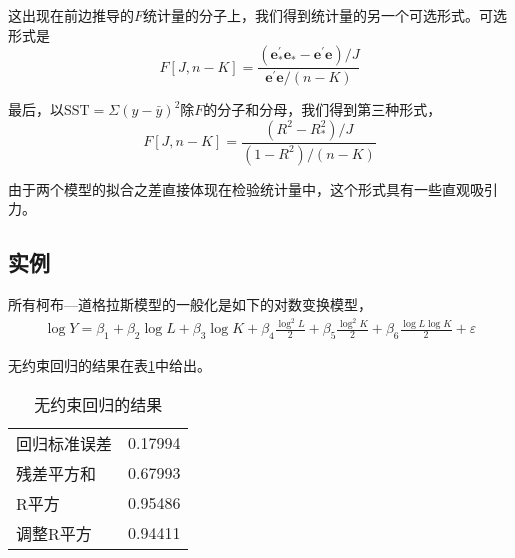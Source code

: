 	这出现在前边推导的$ F $统计量的分子上，我们得到统计量的另一个可选形式。可选形式是
		$$ F[J, n-K]=\frac{\left(\boldsymbol{e}_{*}^{\prime} \boldsymbol{e}_{*}-\boldsymbol{e}^{\prime} 
		\boldsymbol{e}\right) / J}{\boldsymbol{e}^{\prime} \boldsymbol{e} /(n-K)} $$

	最后，以$ \mathrm{SST}=\Sigma(y-\bar{y})^{2} $除$ F $的分子和分母，我们得到第三种形式，
	$$ F[J, n-K]=\frac{\left(R^{2}-R_{*}^{2}\right) / J}{\left(1-R^{2}\right) /(n-K)} $$
	
	由于两个模型的拟合之差直接体现在检验统计量中，这个形式具有一些直观吸引力。
	\subsection{实例}
	所有柯布—道格拉斯模型的一般化是如下的对数变换模型，
	\begin{align}
		\log Y = \beta_{1}+\beta_{2} \log L+\beta_{3} \log K+\beta_{4} \frac{\log ^{2} L}{2}+\beta_{5} \frac{\log ^{2} K}{2}+\beta_{6} \frac{\log L \log K}{2}+\varepsilon
	\end{align}

	无约束回归的结果在表\ref{tab 7.1}中给出。
	\begin{table}[htbp]
		\centering
		\setlength{\tabcolsep}{3em}
		\caption{无约束回归的结果}
		\begin{tabular}{ll}
		\hline
			回归标准误差 & 0.17994 \\
			残差平方和  & 0.67993 \\
			R平方    & 0.95486 \\
			调整R平方  & 0.94411 \\
		\hline
		\end{tabular}
		\label{tab 7.1}
	\end{table}

